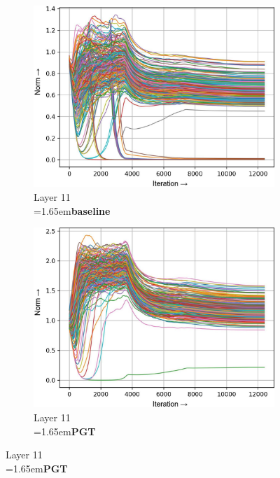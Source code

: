 \documentclass[runningheads]{llncs}
\newcommand{\forceindentb}{\parindent=1.65em\indent\parindent=0pt\relax}
\begin{document}
\begin{figure}[h]
\centering

\begin{subfigure}[t]{0.34\textwidth}
\includegraphics[width=\textwidth]{trimmed/baseline-w-layer-4-2}
\caption{Layer 11\\ \forceindentb\textbf{baseline}}
\end{subfigure}
\begin{subfigure}[t]{0.34\textwidth}
\includegraphics[width=\textwidth]{trimmed/pgt-w-layer-4-2}
\caption{Layer 11\\ \forceindentb\textbf{PGT}}
\end{subfigure}


\end{figure}
\end{document}

